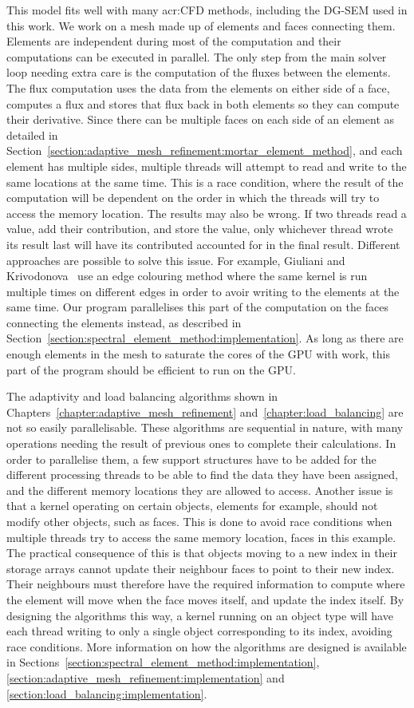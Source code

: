 This model fits well with many \acrshort{acr:CFD} methods, including the DG-SEM used in this work.
We work on a mesh made up of elements and faces connecting them. Elements are independent during
most of the computation and their computations can be executed in parallel. The only step from the
main solver loop needing extra care is the computation of the fluxes between the elements. The flux
computation uses the data from the elements on either side of a face, computes a flux and stores
that flux back in both elements so they can compute their derivative. Since there can be multiple
faces on each side of an element as detailed in
Section~\ref{section:adaptive_mesh_refinement:mortar_element_method}, and each element has multiple
sides, multiple threads will attempt to read and write to the same locations at the same time. This
is a race condition, where the result of the computation will be dependent on the order in which the
threads will try to access the memory location. The results may also be wrong. If two threads read a
value, add their contribution, and store the value, only whichever thread wrote its result last will
have its contributed accounted for in the final result. Different approaches are possible to solve
this issue. For example, Giuliani and Krivodonova~\cite{Giuliani2019} use an edge colouring method
where the same kernel is run multiple times on different edges in order to avoir writing to the
elements at the same time. Our program parallelises this part of the computation on the faces
connecting the elements instead, as described in
Section~\ref{section:spectral_element_method:implementation}. As long as there are enough elements
in the mesh to saturate the cores of the GPU with work, this part of the program should be efficient
to run on the GPU.

The adaptivity and load balancing algorithms shown in
Chapters~\ref{chapter:adaptive_mesh_refinement} and~\ref{chapter:load_balancing} are not so easily
parallelisable. These algorithms are sequential in nature, with many operations needing the result
of previous ones to complete their calculations. In order to parallelise them, a few support
structures have to be added for the different processing threads to be able to find the data they
have been assigned, and the different memory locations they are allowed to access. Another issue is
that a kernel operating on certain objects, elements for example, should not modify other objects,
such as faces. This is done to avoid race conditions when multiple threads try to access the same
memory location, faces in this example. The practical consequence of this is that objects moving to
a new index in their storage arrays cannot update their neighbour faces to point to their new index.
Their neighbours must therefore have the required information to compute where the element will move
when the face moves itself, and update the index itself. By designing the algorithms this way, a
kernel running on an object type will have each thread writing to only a single object corresponding
to its index, avoiding race conditions. More information on how the algorithms are designed is
available in Sections~\ref{section:spectral_element_method:implementation},
\ref{section:adaptive_mesh_refinement:implementation} and
\ref{section:load_balancing:implementation}.


